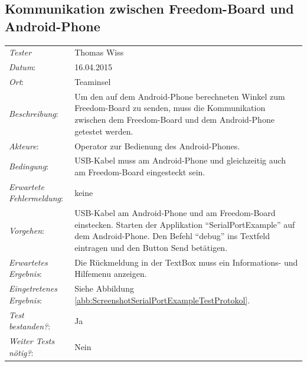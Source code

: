 \subsection{Kommunikation zwischen Freedom-Board und Android-Phone}
\begin{tabular}{p{4.5cm}p{\textwidth-3.6cm-0.7cm}}
    \rule{0pt}{11pt}\textit{Tester}              & Thomas Wiss \\ 
    \rule{0pt}{11pt}\textit{Datum}:           & 16.04.2015   \\
    \rule{0pt}{11pt}\textit{Ort}:             & Teaminsel \\
    \rule{0pt}{11pt}\textit{Beschreibung}:          & Um den auf dem Android-Phone berechneten 
    Winkel zum Freedom-Board zu senden, muss die Kommunikation zwischen dem Freedom-Board 
    und dem Android-Phone getestet werden. \\
    \rule{0pt}{11pt}\textit{Akteure}:          & Operator zur Bedienung des Android-Phones. \\
    \rule{0pt}{11pt}\textit{Bedingung}:          & USB-Kabel muss am Android-Phone und gleichzeitig 
    auch am Freedom-Board eingesteckt sein. \\
    \rule{0pt}{11pt}\textit{Erwartete Fehlermeldung}:          & keine \\
    \rule{0pt}{11pt}\textit{Vorgehen}:          & USB-Kabel am Android-Phone und am 
    Freedom-Board einstecken. Starten der Applikation \enquote{SerialPortExample} auf dem Android-Phone. 
    Den Befehl \enquote{debug} ins Textfeld eintragen und den Button Send betätigen. \\
    \rule{0pt}{11pt}\textit{Erwartetes Ergebnis}:          & Die Rückmeldung in der TextBox 
    muss ein Informations- und Hilfemenu anzeigen. \\
    \rule{0pt}{11pt}\textit{Eingetretenes Ergebnis}:          & Siehe Abbildung 
    \ref{abb:ScreenshotSerialPortExampleTestProtokol}. \\
    \rule{0pt}{11pt}\textit{Test bestanden?}:          & Ja \\
    \rule{0pt}{11pt}\textit{Weiter Tests nötig?}:          & Nein \\
\end{tabular}    
    \newline
    \newline
